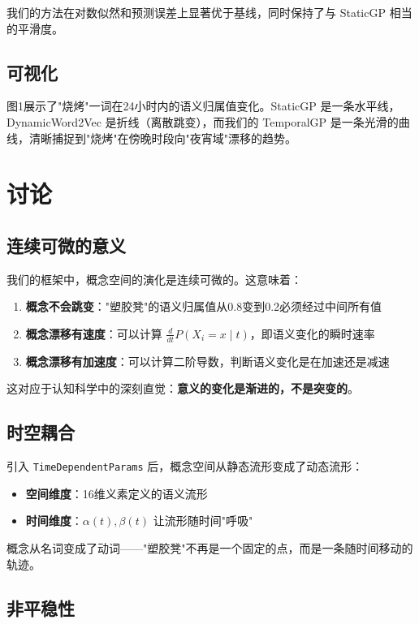 \documentclass[12pt, a4paper]{article}
\begin{document}
我们的方法在对数似然和预测误差上显著优于基线，同时保持了与 StaticGP 相当的平滑度。

\subsection{可视化}

图1展示了"烧烤"一词在24小时内的语义归属值变化。StaticGP 是一条水平线，DynamicWord2Vec 是折线（离散跳变），而我们的 TemporalGP 是一条光滑的曲线，清晰捕捉到"烧烤"在傍晚时段向"夜宵域"漂移的趋势。

\section{讨论}

\subsection{连续可微的意义}

我们的框架中，概念空间的演化是连续可微的。这意味着：

\begin{enumerate}
    \item \textbf{概念不会跳变}："塑胶凳"的语义归属值从0.8变到0.2必须经过中间所有值
    \item \textbf{概念漂移有速度}：可以计算 $\frac{d}{dt} P(X_i = x \mid t)$，即语义变化的瞬时速率
    \item \textbf{概念漂移有加速度}：可以计算二阶导数，判断语义变化是在加速还是减速
\end{enumerate}

这对应于认知科学中的深刻直觉：\textbf{意义的变化是渐进的，不是突变的}。

\subsection{时空耦合}

引入 \texttt{TimeDependentParams} 后，概念空间从静态流形变成了动态流形：

\begin{itemize}
    \item \textbf{空间维度}：16维义素定义的语义流形
    \item \textbf{时间维度}：$\alpha(t), \beta(t)$ 让流形随时间"呼吸"
\end{itemize}

概念从名词变成了动词——"塑胶凳"不再是一个固定的点，而是一条随时间移动的轨迹。

\subsection{非平稳性}
\end{document}

